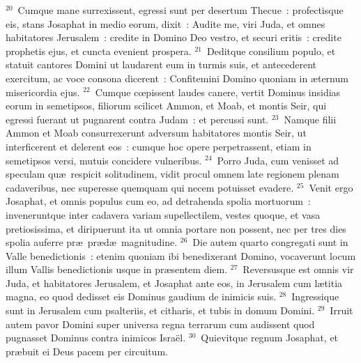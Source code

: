 ${}^{20}$~Cumque mane surrexissent, egressi sunt per desertum Thecue~: profectisque eis, stans Josaphat in medio eorum, dixit~: Audite me, viri Juda, et omnes habitatores Jerusalem~: credite in Domino Deo vestro, et securi eritis~: credite prophetis ejus, et cuncta evenient prospera.
${}^{21}$~Deditque consilium populo, et statuit cantores Domini ut laudarent eum in turmis suis, et antecederent exercitum, ac voce consona dicerent~: Confitemini Domino quoniam in \ae ternum misericordia ejus.
${}^{22}$~Cumque cœpissent laudes canere, vertit Dominus insidias eorum in semetipsos, filiorum scilicet Ammon, et Moab, et montis Seir, qui egressi fuerant ut pugnarent contra Judam~: et percussi sunt.
${}^{23}$~Namque filii Ammon et Moab consurrexerunt adversum habitatores montis Seir, ut interficerent et delerent eos~: cumque hoc opere perpetrassent, etiam in semetipsos versi, mutuis concidere vulneribus.
${}^{24}$~Porro Juda, cum venisset ad speculam qu\ae\ respicit solitudinem, vidit procul omnem late regionem plenam cadaveribus, nec superesse quemquam qui necem potuisset evadere.
${}^{25}$~Venit ergo Josaphat, et omnis populus cum eo, ad detrahenda spolia mortuorum~: inveneruntque inter cadavera variam supellectilem, vestes quoque, et vasa pretiosissima, et diripuerunt ita ut omnia portare non possent, nec per tres dies spolia auferre pr\ae\ pr\ae d\ae\ magnitudine.
${}^{26}$~Die autem quarto congregati sunt in Valle benedictionis~: etenim quoniam ibi benedixerant Domino, vocaverunt locum illum Vallis benedictionis usque in pr\ae sentem diem.
${}^{27}$~Reversusque est omnis vir Juda, et habitatores Jerusalem, et Josaphat ante eos, in Jerusalem cum l\ae titia magna, eo quod dedisset eis Dominus gaudium de inimicis suis.
${}^{28}$~Ingressique sunt in Jerusalem cum psalteriis, et citharis, et tubis in domum Domini.
${}^{29}$~Irruit autem pavor Domini super universa regna terrarum cum audissent quod pugnasset Dominus contra inimicos Isra\"el.
${}^{30}$~Quievitque regnum Josaphat, et pr\ae buit ei Deus pacem per circuitum.


